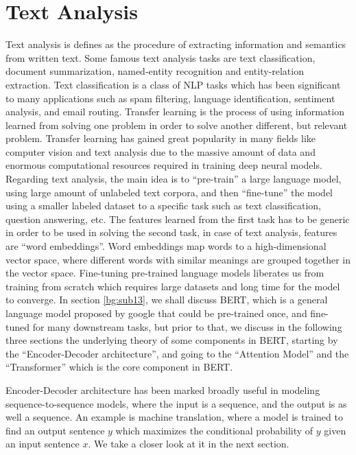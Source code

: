 \section{Text Analysis} \label{bg:s4}

Text analysis is defines as the procedure of extracting information and semantics from written text. Some famous text analysis tasks are text classification, document summarization, named-entity recognition and entity-relation extraction. 
Text classification is a class of \ac{NLP} tasks which has been significant to many applications such as spam filtering, language identification, sentiment analysis, and email routing. 
Transfer learning is the process of using information learned from solving one problem in order to solve another different, but relevant problem. 
Transfer learning has gained great popularity in many fields like computer vision and text analysis due to the massive amount of data and enormous computational resources required in training deep neural models. 
Regarding text analysis, the main idea is to \enquote{pre-train} a large language model, using large amount of unlabeled text corpora, and then \enquote{fine-tune} the model using a smaller labeled dataset to a specific task such as text classification, question answering, etc. 
The features learned from the first task has to be generic in order to be used in solving the second task, in case of text analysis, features are \enquote{word embeddings}. 
Word embeddings map words to a high-dimensional vector space, where different words with similar meanings are grouped together in the vector space. Fine-tuning pre-trained language models liberates us from training from scratch which requires large datasets and long time for the model to converge. 
In section \ref{bg:sub13}, we shall discuss \ac{BERT}, which is a general language model proposed by google that could be pre-trained once, and fine-tuned for many downstream tasks, but prior to that, we discuss in the following three sections the underlying theory of some components in \ac{BERT}, starting by the \enquote{Encoder-Decoder architecture}, and going to the \enquote{Attention Model} and the \enquote{Transformer} which is the core component in \ac{BERT}. 

Encoder-Decoder architecture has been marked broadly useful in modeling sequence-to-sequence models, where the input is a sequence, and the output is as well a sequence. An example is machine translation, where a model is trained to find an output sentence $y$ which maximizes the conditional probability of $y$ given an input sentence $x$. We take a closer look at it in the next section.


